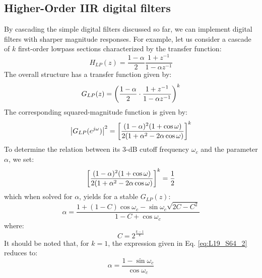 \documentclass[../../main/main.tex]{subfiles}
\begin{document}
\subsection{Higher-Order IIR digital filters}
By cascading the simple digital filters discussed so far, we can implement digital filters with sharper magnitude responses. For example, let us consider a cascade of \( k \) first-order lowpass sections characterized by the transfer function:
\begin{equation}
    H_{LP}(z)
    =
    \frac{1 - \alpha}{2} \frac{1 + z^{-1}}{1 - \alpha z^{-1}}
    \label{eq:L19_S62_1}
\end{equation}
The overall structure has a transfer function given by:
\begin{equation}
    G_{LP}(z)
    =
    \qty(\frac{1 - \alpha}{2} \cdot \frac{1 + z^{-1}}{1 - \alpha z^{-1}})^{k}
    \label{eq:L19_S63_1}
\end{equation}
The corresponding squared-magnitude function is given by:
\begin{equation}
    \abs{G_{LP}(e^{j\omega})}^{2}
    =
    \qty[\frac{(1 - \alpha)^{2} (1 + \cos\omega)}{2(1 + \alpha^{2} - 2\alpha\cos\omega)}]^{k}
    \label{eq:L19_S63_2}
\end{equation}
To determine the relation between its 3-dB cutoff frequency \( \omega_{c} \) and the parameter \( \alpha \), we set:
\begin{equation}
    \qty[\frac{(1 - \alpha)^{2} (1 + \cos\omega)}{2(1 + \alpha^{2} - 2\alpha\cos\omega)}]^{k}
    =
    \frac{1}{2}
    \label{eq:L19_S64_1}
\end{equation}
which when solved for \( \alpha \), yields for a stable \( G_{LP}(z) \):
\begin{equation}
    \alpha
    =
    \frac{1 + (1-C) \cos\omega_{c} - \sin\omega_{c} \sqrt{2C - C^{2}}}{1 - C + \cos\omega_{c}}
    \label{eq:L19_S64_2}
\end{equation}
where:
\begin{equation}
    C
    =
    2^{\frac{k - 1}{k}}
    \label{eq:L19_S65_1}
\end{equation}
It should be noted that, for \( k = 1 \), the expression given in Eq. \ref{eq:L19_S64_2} reduces to:
\begin{equation}
    \alpha
    =
    \frac{1 - \sin\omega_{c}}{\cos\omega_{c}}
    \label{eq:L19_S65_2}
\end{equation}
\end{document}
